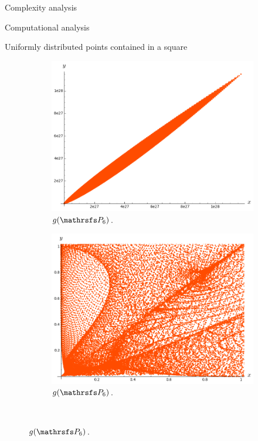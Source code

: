 \documentclass[11pt, a4paper, english, twoside, notitlepage, openright]{report}
\begin{document}
\begin{chapter}{Complexity analysis}
\begin{section}{Computational analysis}
\begin{subsection}{Uniformly distributed points contained in a square}
\begin{figure}
\hspace{-0.1cm}
\begin{subfigure}{.49\linewidth}\centering
\includegraphics[width=1\textwidth]{plots/ch5_16_P6.png}
\vspace{0cm}\caption{$g(\PP_6)$.\label{fig:gP6_1}}
\end{subfigure}
\begin{subfigure}{.49\linewidth}\centering
\includegraphics[width=1\textwidth]{plots/ch5_17_P6prime.png}
\vspace{0cm}\caption{$g(\PP_6)$.\label{fig:gP6_2}}
\end{subfigure}\\[1ex]
\vspace{0.4cm}
	

\end{figure}
\end{subsection}
\end{section}
\end{chapter}
\end{document}
